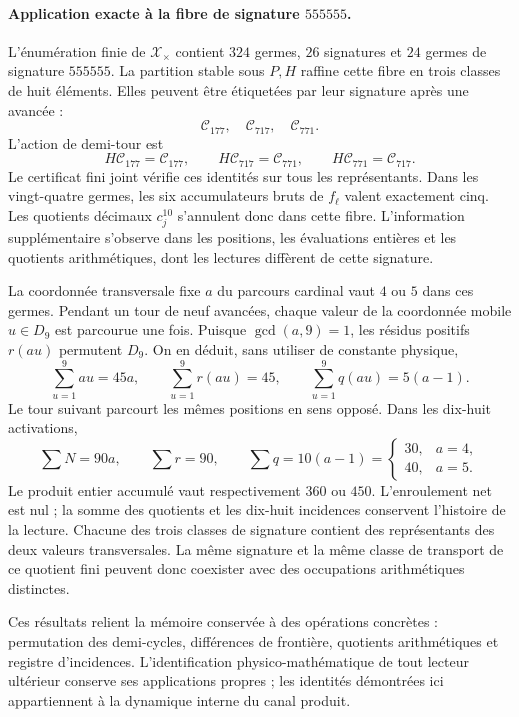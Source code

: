 \paragraph{Application exacte à la fibre de signature \texorpdfstring{$555555$}{555555}.}

L'énumération finie de $\mathscr X_\times$ contient $324$ germes,
$26$ signatures et $24$ germes de signature $555555$. La partition stable
sous $P,H$ raffine cette fibre en trois classes de huit éléments. Elles peuvent
être étiquetées par leur signature après une avancée :
\[
 \mathscr C_{177},\quad\mathscr C_{717},\quad\mathscr C_{771}.
\]
L'action de demi-tour est
\[
 H\mathscr C_{177}=\mathscr C_{177},\qquad
 H\mathscr C_{717}=\mathscr C_{771},\qquad
 H\mathscr C_{771}=\mathscr C_{717}.
\]
Le certificat fini joint vérifie ces identités sur tous les
représentants. Dans les vingt-quatre germes, les six accumulateurs
bruts de $f_\ell$ valent exactement cinq. Les quotients
décimaux $c_j^{10}$ s'annulent donc dans cette fibre. L'information supplémentaire
s'observe dans les positions, les évaluations entières et les quotients
arithmétiques, dont les lectures diffèrent de cette signature.

La coordonnée transversale fixe $a$ du parcours cardinal vaut $4$ ou
$5$ dans ces germes. Pendant un tour de neuf avancées, chaque
valeur de la coordonnée mobile $u\in D_9$ est parcourue une fois. Puisque
$\gcd(a,9)=1$, les résidus positifs $r(au)$ permutent $D_9$.
On en déduit, sans utiliser de constante physique,
\[
 \sum_{u=1}^9au=45a,\qquad
 \sum_{u=1}^9r(au)=45,\qquad
 \sum_{u=1}^9q(au)=5(a-1).
\]
Le tour suivant parcourt les mêmes positions en sens opposé.
Dans les dix-huit activations,
\begin{equation}
 \sum N=90a,\qquad\sum r=90,\qquad
 \sum q=10(a-1)=
 \begin{cases}30,&a=4,\\40,&a=5.\end{cases}
 \label{bim09:ocupacion-30-40}
\end{equation}
Le produit entier accumulé vaut respectivement $360$ ou $450$.
L'enroulement net est nul ; la somme des quotients et les dix-huit
incidences conservent l'histoire de la lecture. Chacune des trois
classes de signature contient des représentants des deux valeurs transversales.
La même signature et la même classe de transport de ce quotient fini
peuvent donc coexister avec des occupations arithmétiques distinctes.

Ces résultats relient la mémoire conservée à des opérations
concrètes : permutation des demi-cycles, différences de frontière,
quotients arithmétiques et registre d'incidences. L'identification
physico-mathématique de tout lecteur ultérieur conserve ses applications
propres ; les identités démontrées ici appartiennent à la dynamique
interne du canal produit.
